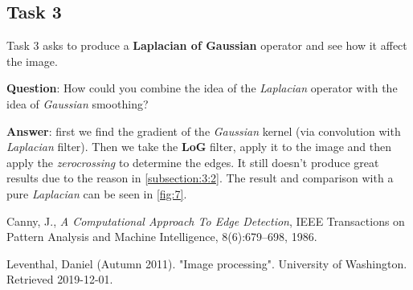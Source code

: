 \documentclass[lettersize,journal]{IEEEtran}
\begin{document}
\subsection{Task 3}

\noindent Task 3 asks to produce a \textbf{Laplacian of Gaussian} operator and see how it affect the image.

\hfill

\noindent\textbf{Question}: How could you combine the idea of the \emph{Laplacian} operator with the idea of \emph{Gaussian} smoothing?

\hfill

\noindent\textbf{Answer}: first we find the gradient of the \emph{Gaussian} kernel (via convolution with \emph{Laplacian} filter). Then we take the \textbf{LoG} filter, apply it to the image and then apply the \emph{zerocrossing} to determine the edges. It still doesn't produce great results due to the reason in \autoref{subsection:3:2}. The result and comparison with a pure \emph{Laplacian} can be seen in \autoref{fig:7}.


\begin{thebibliography}{1}


Canny, J., {\it{A Computational Approach To Edge Detection}}, IEEE Transactions on Pattern Analysis and Machine Intelligence, 8(6):679–698, 1986.

Leventhal, Daniel (Autumn 2011). "Image processing". University of Washington. Retrieved 2019-12-01.

\end{thebibliography}
\end{document}
